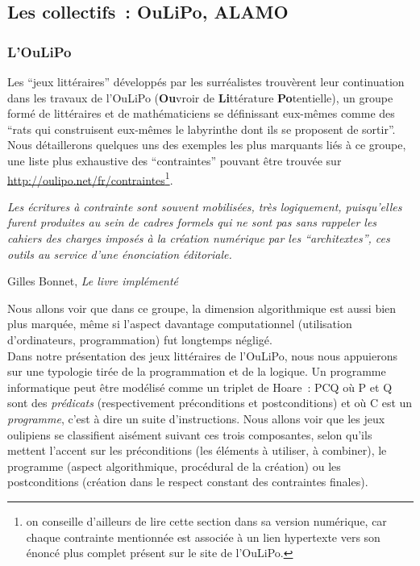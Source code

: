 \documentclass{article}
\newenvironment{citationbox}
{\begin{center}
		\begin{minipage}{.8\textwidth}
		}
		{
		\end{minipage}	
\end{center}
}
\begin{document}
		\subsection{Les collectifs~: OuLiPo, ALAMO}
			\subsubsection{L'OuLiPo}
				Les ``jeux littéraires'' développés par les surréalistes trouvèrent leur continuation dans les travaux de l'OuLiPo (\textbf{Ou}vroir de \textbf{Li}ttérature \textbf{Po}tentielle), un groupe formé de littéraires et de mathématiciens se définissant eux-mêmes comme des ``rats qui construisent eux-mêmes le labyrinthe dont ils se proposent de sortir''. Nous détaillerons quelques uns des exemples les plus marquants liés à ce groupe, une liste plus exhaustive des ``contraintes'' pouvant être trouvée sur \href{http://oulipo.net/fr/contraintes}{http://oulipo.net/fr/contraintes}\footnote{on conseille d'ailleurs de lire cette section dans sa version numérique, car chaque contrainte mentionnée est associée à un lien hypertexte vers son énoncé plus complet présent sur le site de l'OuLiPo.}.
				\begin{citationbox}
					\textit{Les écritures à contrainte sont souvent mobilisées, très logiquement, puisqu’elles furent produites au sein de cadres formels qui ne sont pas sans rappeler les cahiers des charges imposés à la création numérique par les ``architextes'', ces outils au service d’une énonciation éditoriale.}\begin{flushright}
						Gilles Bonnet, \textit{Le livre implémenté} \cite{bonnet2017}
					\end{flushright}
				\end{citationbox}
				
				Nous allons voir que dans ce groupe, la dimension algorithmique est aussi bien plus marquée, même si l'aspect davantage computationnel (utilisation d'ordinateurs, programmation) fut longtemps négligé.\\
				
				Dans notre présentation des jeux littéraires de l'OuLiPo, nous nous appuierons sur une typologie tirée de la programmation et de la logique. Un programme informatique peut être modélisé comme un triplet de Hoare~: {P}C{Q} où P et Q sont des \textit{prédicats} (respectivement préconditions et postconditions) et où C est un \textit{programme}, c'est à dire un suite d'instructions. Nous allons voir que les jeux oulipiens se classifient aisément suivant ces trois composantes, selon qu'ils mettent l'accent sur les préconditions (les éléments à utiliser, à combiner), le programme (aspect algorithmique, procédural de la création) ou les postconditions (création dans le respect constant des contraintes finales).
				
\end{document}
